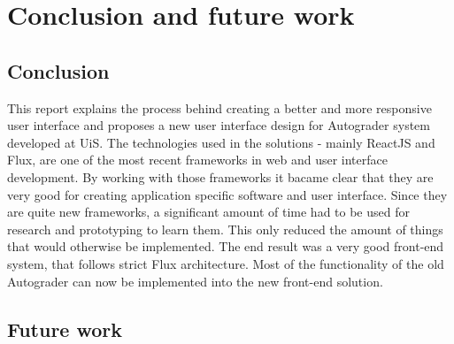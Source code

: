 \chapter{Conclusion and future work}
\section{Conclusion}
This report explains the process behind creating a better and more responsive user interface and proposes a new user interface design for Autograder system developed at UiS. The technologies used in the solutions - mainly ReactJS and Flux, are one of the most recent frameworks in web and user interface development. By working with those frameworks it bacame clear that they are very good for creating application specific software and user interface. Since they are quite new frameworks, a significant amount of time had to be used for research and prototyping to learn them. This only reduced the amount of things that would otherwise be implemented. The end result was a very good front-end system, that follows strict Flux architecture. Most of the functionality of the old Autograder can now be implemented into the new front-end solution.
\section{Future work}
